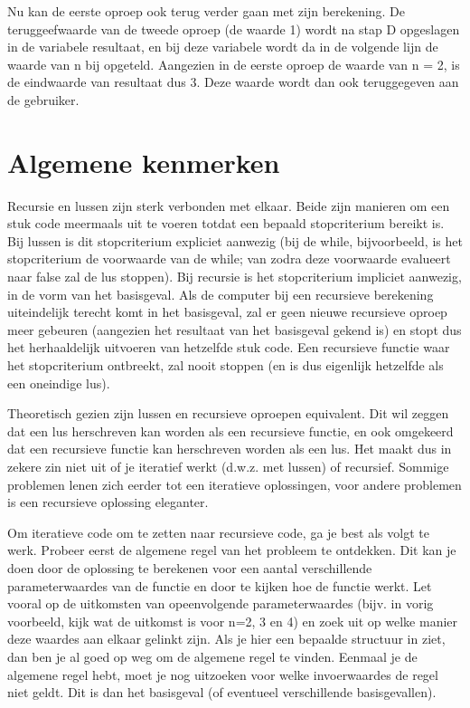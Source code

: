 Nu kan de eerste oproep ook terug verder gaan met zijn berekening. De teruggeefwaarde van de tweede oproep (de waarde 1) wordt na stap D opgeslagen in de variabele resultaat, en bij deze variabele wordt da in de volgende lijn de waarde van n bij opgeteld. Aangezien in de eerste oproep de waarde van n = 2, is de eindwaarde van resultaat dus 3. Deze waarde wordt dan ook teruggegeven aan de gebruiker.

\section{Algemene kenmerken}

Recursie en lussen zijn sterk verbonden met elkaar. Beide zijn manieren om een stuk code meermaals uit te voeren totdat een bepaald stopcriterium bereikt is. Bij lussen is dit stopcriterium expliciet aanwezig (bij de while, bijvoorbeeld, is het stopcriterium de voorwaarde van de while; van zodra deze voorwaarde evalueert naar false zal de lus stoppen). Bij recursie is het stopcriterium impliciet aanwezig, in de vorm van het basisgeval. Als de computer bij een recursieve berekening uiteindelijk terecht komt in het basisgeval, zal er geen nieuwe recursieve oproep meer gebeuren (aangezien het resultaat van het basisgeval gekend is) en stopt dus het herhaaldelijk uitvoeren van hetzelfde stuk code. Een recursieve functie waar het stopcriterium ontbreekt, zal nooit stoppen (en is dus eigenlijk hetzelfde als een oneindige lus).

Theoretisch gezien zijn lussen en recursieve oproepen equivalent. Dit wil zeggen dat een lus herschreven kan worden als een recursieve functie, en ook omgekeerd dat een recursieve functie kan herschreven worden als een lus. Het maakt dus in zekere zin niet uit of je iteratief werkt (d.w.z. met lussen) of recursief. Sommige problemen lenen zich eerder tot een iteratieve oplossingen, voor andere problemen is een recursieve oplossing eleganter.

Om iteratieve code om te zetten naar recursieve code, ga je best als volgt te werk. Probeer eerst de algemene regel van het probleem te ontdekken. Dit kan je doen door de oplossing te berekenen voor een aantal verschillende parameterwaardes van de functie en door te kijken hoe de functie werkt. Let vooral op de uitkomsten van opeenvolgende parameterwaardes (bijv. in vorig voorbeeld, kijk wat de uitkomst is voor n=2, 3 en 4) en zoek uit op welke manier deze waardes aan elkaar gelinkt zijn. Als je hier een bepaalde structuur in ziet, dan ben je al goed op weg om de algemene regel te vinden. Eenmaal je de algemene regel hebt, moet je nog uitzoeken voor welke invoerwaardes de regel niet geldt. Dit is dan het basisgeval (of eventueel verschillende basisgevallen).

